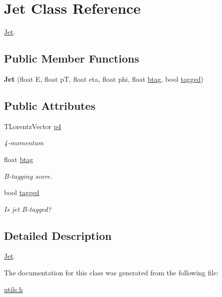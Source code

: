 \hypertarget{classJet}{}\section{Jet Class Reference}
\label{classJet}


\mbox{\hyperlink{classJet}{Jet}}.  


\subsection*{Public Member Functions}
\begin{DoxyCompactItemize}
\item 
\mbox{\label{classJet_ababfa0edc9bbbade41bc21fbaab1b37f}} 
{\bfseries Jet} (float E, float pT, float eta, float phi, float \mbox{\hyperlink{classJet_a88d5ae860a2d8db6013f0a2bad1b6553}{btag}}, bool \mbox{\hyperlink{classJet_adc4c6f3fb6ceceb474d3b17b43eff9bf}{tagged}})
\end{DoxyCompactItemize}
\subsection*{Public Attributes}
\begin{DoxyCompactItemize}
\item 
\mbox{\label{classJet_a1899c7a0c0f7ab0aa8fbbaa7be0b2703}} 
T\+Lorentz\+Vector \mbox{\hyperlink{classJet_a1899c7a0c0f7ab0aa8fbbaa7be0b2703}{p4}}
\begin{DoxyCompactList}\small\item\em 4-\/momentum \end{DoxyCompactList}\item 
\mbox{\label{classJet_a88d5ae860a2d8db6013f0a2bad1b6553}} 
float \mbox{\hyperlink{classJet_a88d5ae860a2d8db6013f0a2bad1b6553}{btag}}
\begin{DoxyCompactList}\small\item\em B-\/tagging score. \end{DoxyCompactList}\item 
\mbox{\label{classJet_adc4c6f3fb6ceceb474d3b17b43eff9bf}} 
bool \mbox{\hyperlink{classJet_adc4c6f3fb6ceceb474d3b17b43eff9bf}{tagged}}
\begin{DoxyCompactList}\small\item\em Is jet B-\/tagged? \end{DoxyCompactList}\end{DoxyCompactItemize}


\subsection{Detailed Description}
\mbox{\hyperlink{classJet}{Jet}}. 

The documentation for this class was generated from the following file\+:\begin{DoxyCompactItemize}
\item 
\mbox{\hyperlink{utils_8h}{utils.\+h}}\end{DoxyCompactItemize}
